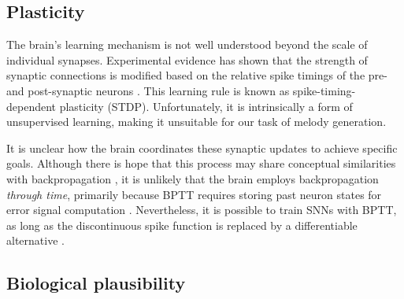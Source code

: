 \documentclass[../../report.tex]{subfiles}
\begin{document}

\subsection{Plasticity}

The brain's learning mechanism is not well understood beyond the scale of
individual synapses. Experimental evidence has shown that the strength of
synaptic connections is modified based on the relative spike timings of the pre-
and post-synaptic neurons \cite{Bliss1973}. This learning rule is known as
spike-timing-dependent plasticity (STDP). Unfortunately, it is intrinsically a
form of unsupervised learning, making it unsuitable for our task of melody
generation.

It is unclear how the brain coordinates these synaptic updates to achieve
specific goals. Although there is hope that this process may share conceptual
similarities with backpropagation \cite{Lillicrap2020}, it is unlikely that the
brain employs backpropagation \emph{through time}, primarily because BPTT
requires storing past neuron states for error signal computation
\cite{Lillicrap2019}. Nevertheless, it is possible to train SNNs with BPTT, as
long as the discontinuous spike function is replaced by a differentiable
alternative \cite{Bellec2018LSNN}.

\subsection{Biological plausibility}
\end{document}
